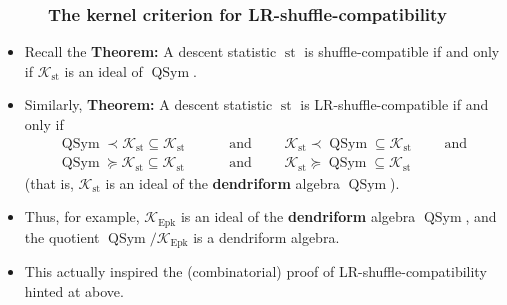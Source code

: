 \documentclass{beamer}
\newcommand{\Epk}{\operatorname{Epk}}
\newcommand{\st}{\operatorname{st}}
\newcommand{\QSym}{\operatorname{QSym}}
\newcommand{\calK}{\mathcal{K}}
\newcommand{\fti}[1]{\frametitle{\ \ \ \ \ #1}}
\theoremstyle{plain}
\begin{document}
\begin{frame}
\fti{The kernel criterion for LR-shuffle-compatibility}

\begin{itemize}

\item Recall the \textbf{Theorem:} A descent statistic $\st$ is
      shuffle-compatible if and only if $\calK_{\st}$ is an
      ideal of $\QSym$.

\pause
\item Similarly, \textbf{Theorem:} A descent statistic $\st$ is
      LR-shuffle-compatible if and only if %
      \begin{align*}
      \QSym \prec \calK_{\st}
      \subseteq \calK_{\st} \qquad &\text{ and } \qquad \calK_{\st} \prec \QSym
      \subseteq \calK_{\st} \qquad \text{ and } \\
      \QSym \succeq \calK_{\st}
      \subseteq \calK_{\st} \qquad &\text{ and } \qquad \calK_{\st} \succeq \QSym
      \subseteq \calK_{\st}
      \end{align*}
      (that is, $\calK_{\st}$ is an ideal of the \textbf{dendriform}
      algebra $\QSym$).

\pause

\item Thus, for example, $\mathcal{K}_{\Epk}$ is an ideal of the \textbf{dendriform}
      algebra $\QSym$, and the quotient
      $\QSym / \mathcal{K}_{\Epk}$ is a dendriform algebra.
\pause

\item This actually inspired the (combinatorial) proof of
      LR-shuffle-compatibility hinted at above.

\end{itemize}

\vspace{10cm}

\end{frame}
\end{document}
